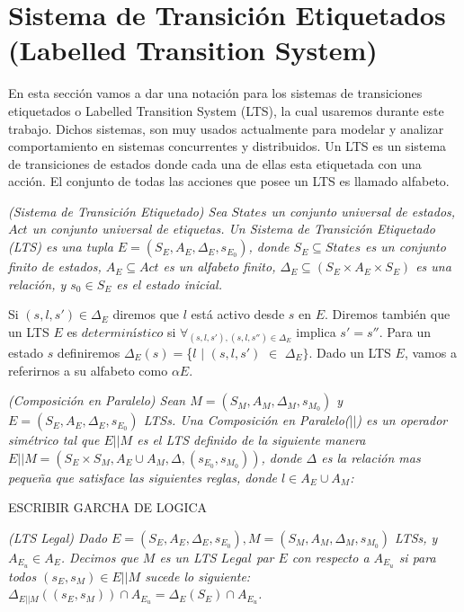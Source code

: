 \section{Sistema de Transición Etiquetados (Labelled Transition System)}

En esta sección vamos a dar una notación para los sistemas de transiciones etiquetados o Labelled Transition System
(LTS), la cual usaremos durante este trabajo. Dichos sistemas, son muy usados actualmente para modelar y analizar
comportamiento en sistemas concurrentes y distribuidos. Un LTS es un sistema de transiciones de estados donde cada una
de ellas esta etiquetada con una acción. El conjunto de todas las acciones que posee un LTS es llamado alfabeto.

\begin{nahaDef}
    \emph{(Sistema de Transición Etiquetado)\cite{Keller:1976:FVP:360248.360251} Sea $States$ un conjunto universal de estados, $Act$ un conjunto
    universal de etiquetas. Un Sistema de Transición Etiquetado (LTS) es una tupla $E = (S_E,A_E,\Delta_E,s_{E_0})$,
    donde $S_E \subseteq States$ es un conjunto finito de estados, $A_E \subseteq Act$ es un alfabeto finito, $\Delta_E
    \subseteq (S_E \times A_E \times S_E)$ es una relación, y $s_0 \in S_E$ es el estado inicial.}
\end{nahaDef}

Si $(s,l,s') \in \Delta_E$ diremos que $l$ está activo desde $s$ en $E$. Diremos también que un LTS $E$ es
$determinístico$ si $\forall_{(s,l,s'),(s,l,s'') \in \Delta_E}$ implica $s' = s''$. Para un estado $s$ definiremos
$\Delta_E(s) = $\{$l$ $|$ $(s,l,s')$ $\in$ $\Delta_E\}$. Dado un LTS $E$, vamos a referirnos a su alfabeto como $\alpha E$.

\begin{nahaDef}
    \emph{(Composición en Paralelo) Sean $M = (S_M,A_M,\Delta_M, s_{M_0})$ y $E = (S_E,A_E,\Delta_E, s_{E_0})$ LTSs.
    Una Composición en Paralelo($||$) es un operador simétrico tal que $E||M$ es el LTS definido de la siguiente
    manera $E||M = (S_E \times S_M, A_E \cup A_M, \Delta, (s_{E_0},s_{M_0}))$, donde $\Delta$ es la relación mas
    pequeña que satisface las siguientes reglas, donde $l \in A_E \cup A_M$:}
\end{nahaDef}

ESCRIBIR GARCHA DE LOGICA

\begin{nahaDef}
    \emph{(LTS Legal) Dado $E = (S_E, A_E, \Delta_E, s_{E_0}), M = (S_M, A_M, \Delta_M, s_{M_0})$ LTSs, y $A_{E_u} \in
    A_E$. Decimos que $M$ es un LTS $Legal$ par $E$ con respecto a $A_{E_u}$ si para todos $(s_E,s_M) \in E||M$ sucede
    lo siguiente: $\Delta_{E||M}((s_E,s_M)) \cap A_{E_u} = \Delta_E(S_E) \cap A_{E_u}$.}
\end{nahaDef} 

